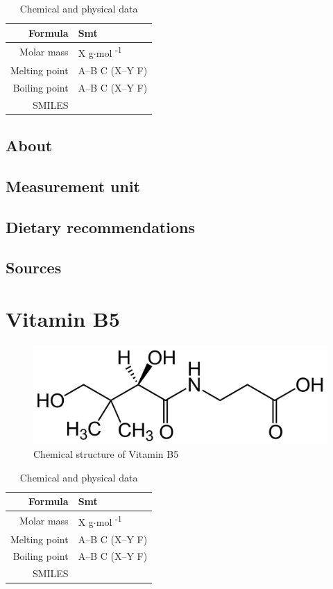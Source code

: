 \documentclass{book}
\begin{document}
\begin{table}[h]
	\caption{Chemical and physical data}
	\centering \begin{tabular}{| r | l |}
		\hline
		Formula & Smt\\ \hline
		Molar mass & X g$\cdot$mol \textsuperscript{-1}\\ \hline
		Melting point & A--B \degree C (X--Y \degree F)\\ \hline
		Boiling point & A--B \degree C (X--Y \degree F)\\ \hline
		SMILES & \\ \hline
	\end{tabular}
\end{table}
\newpage

\section{About}


\section{Measurement unit}


\section{Dietary recommendations}


\section{Sources}


\chapter{Vitamin B5}
\begin{figure}[h]
	\caption{Chemical structure of Vitamin B5}
	\centering \includegraphics[width=\textwidth]{images/Vitamin_B5_chemical_structure}
\end{figure}

\begin{table}[h]
	\caption{Chemical and physical data}
	\centering \begin{tabular}{| r | l |}
		\hline
		Formula & Smt\\ \hline
		Molar mass & X g$\cdot$mol \textsuperscript{-1}\\ \hline
		Melting point & A--B \degree C (X--Y \degree F)\\ \hline
		Boiling point & A--B \degree C (X--Y \degree F)\\ \hline
		SMILES & \\ \hline
	\end{tabular}
\end{table}
\newpage
\end{document}

